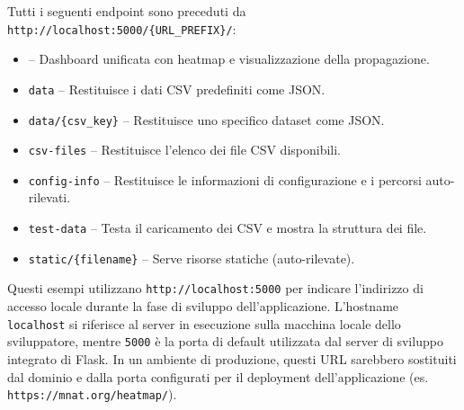 Tutti i seguenti endpoint sono preceduti da \texttt{http://localhost:5000/\{URL\_PREFIX\}/}:

\begin{itemize}
    \item \texttt{} -- Dashboard unificata con heatmap e visualizzazione della propagazione.
    \item \texttt{data} -- Restituisce i dati CSV predefiniti come JSON.
    \item \texttt{data/\{csv\_key\}} -- Restituisce uno specifico dataset come JSON.
    \item \texttt{csv-files} -- Restituisce l'elenco dei file CSV disponibili.
    \item \texttt{config-info} -- Restituisce le informazioni di configurazione e i percorsi auto-rilevati.
    \item \texttt{test-data} -- Testa il caricamento dei CSV e mostra la struttura dei file.
    \item \texttt{static/\{filename\}} -- Serve risorse statiche (auto-rilevate).
\end{itemize}

Questi esempi utilizzano \texttt{http://localhost:5000} per indicare l'indirizzo di accesso locale durante la fase di sviluppo dell'applicazione. L'hostname \texttt{localhost} si riferisce al server in esecuzione sulla macchina locale dello sviluppatore, mentre \texttt{5000} è la porta di default utilizzata dal server di sviluppo integrato di Flask. In un ambiente di produzione, questi URL sarebbero sostituiti dal dominio e dalla porta configurati per il deployment dell'applicazione (es. \texttt{https://mnat.org/heatmap/}).

\newpage
